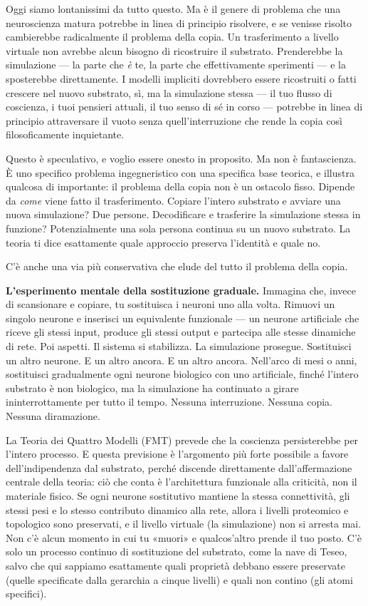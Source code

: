 \documentclass[11pt, twoside, openright]{book}
\begin{document}
Oggi siamo lontanissimi da tutto questo. Ma è il genere di problema che una neuroscienza matura potrebbe in linea di principio risolvere, e se venisse risolto cambierebbe radicalmente il problema della copia. Un trasferimento a livello virtuale non avrebbe alcun bisogno di ricostruire il substrato. Prenderebbe la simulazione --- la parte che \textit{è} te, la parte che effettivamente sperimenti --- e la sposterebbe direttamente. I modelli impliciti dovrebbero essere ricostruiti o fatti crescere nel nuovo substrato, sì, ma la simulazione stessa --- il tuo flusso di coscienza, i tuoi pensieri attuali, il tuo senso di sé in corso --- potrebbe in linea di principio attraversare il vuoto senza quell'interruzione che rende la copia così filosoficamente inquietante.

Questo è speculativo, e voglio essere onesto in proposito. Ma non è fantascienza. È uno specifico problema ingegneristico con una specifica base teorica, e illustra qualcosa di importante: il problema della copia non è un ostacolo fisso. Dipende da \textit{come} viene fatto il trasferimento. Copiare l'intero substrato e avviare una nuova simulazione? Due persone. Decodificare e trasferire la simulazione stessa in funzione? Potenzialmente una sola persona continua su un nuovo substrato. La teoria ti dice esattamente quale approccio preserva l'identità e quale no.

C'è anche una via più conservativa che elude del tutto il problema della copia.

\textbf{L'esperimento mentale della sostituzione graduale.} Immagina che, invece di scansionare e copiare, tu sostituisca i neuroni uno alla volta. Rimuovi un singolo neurone e inserisci un equivalente funzionale --- un neurone artificiale che riceve gli stessi input, produce gli stessi output e partecipa alle stesse dinamiche di rete. Poi aspetti. Il sistema si stabilizza. La simulazione prosegue. Sostituisci un altro neurone. E un altro ancora. E un altro ancora. Nell'arco di mesi o anni, sostituisci gradualmente ogni neurone biologico con uno artificiale, finché l'intero substrato è non biologico, ma la simulazione ha continuato a girare ininterrottamente per tutto il tempo. Nessuna interruzione. Nessuna copia. Nessuna diramazione.

La Teoria dei Quattro Modelli (FMT) prevede che la coscienza persisterebbe per l'intero processo. E questa previsione è l'argomento più forte possibile a favore dell'indipendenza dal substrato, perché discende direttamente dall'affermazione centrale della teoria: ciò che conta è l'architettura funzionale alla criticità, non il materiale fisico. Se ogni neurone sostitutivo mantiene la stessa connettività, gli stessi pesi e lo stesso contributo dinamico alla rete, allora i livelli proteomico e topologico sono preservati, e il livello virtuale (la simulazione) non si arresta mai. Non c'è alcun momento in cui tu «muori» e qualcos'altro prende il tuo posto. C'è solo un processo continuo di sostituzione del substrato, come la nave di Teseo, salvo che qui sappiamo esattamente quali proprietà debbano essere preservate (quelle specificate dalla gerarchia a cinque livelli) e quali non contino (gli atomi specifici).
\end{document}
